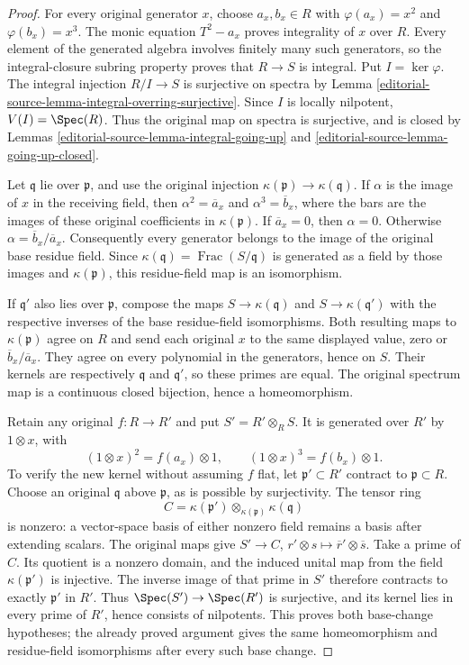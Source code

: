 \begin{proof}
For every original generator $x$, choose $a_x,b_x\in R$
with $\varphi(a_x)=x^2$ and $\varphi(b_x)=x^3$.
The monic equation $T^2-a_x$ proves integrality of
$x$ over $R$. Every element of the generated algebra
involves finitely many such generators, so the
integral-closure subring property proves that
$R\to S$ is integral. Put $I=\ker\varphi$.
The integral injection $R/I\to S$ is surjective
on spectra by Lemma \ref{editorial-source-lemma-integral-overring-surjective}.
Since $I$ is locally nilpotent, $V(I)=\Spec(R)$.
Thus the original map on spectra is surjective,
and is closed by Lemmas \ref{editorial-source-lemma-integral-going-up}
and \ref{editorial-source-lemma-going-up-closed}.

Let $\mathfrak q$ lie over $\mathfrak p$, and use
the original injection
$\kappa(\mathfrak p)\to\kappa(\mathfrak q)$.
If $\alpha$ is the image of $x$ in the receiving
field, then $\alpha^2=\overline a_x$ and
$\alpha^3=\overline b_x$, where the bars are the
images of these original coefficients in
$\kappa(\mathfrak p)$. If $\overline a_x=0$,
then $\alpha=0$. Otherwise
$\alpha=\overline b_x/\overline a_x$.
Consequently every generator belongs to the
image of the original base residue field.
Since $\kappa(\mathfrak q)=\operatorname{Frac}(S/\mathfrak q)$
is generated as a field by those images and
$\kappa(\mathfrak p)$, this residue-field map
is an isomorphism.

If $\mathfrak q'$ also lies over $\mathfrak p$,
compose the maps $S\to\kappa(\mathfrak q)$ and
$S\to\kappa(\mathfrak q')$ with the respective
inverses of the base residue-field isomorphisms.
Both resulting maps to $\kappa(\mathfrak p)$
agree on $R$ and send each original $x$ to
the same displayed value, zero or
$\overline b_x/\overline a_x$.
They agree on every polynomial in the
generators, hence on $S$. Their kernels
are respectively $\mathfrak q$ and
$\mathfrak q'$, so these primes are equal.
The original spectrum map is a continuous
closed bijection, hence a homeomorphism.

Retain any original $f:R\to R'$ and put
$S'=R'\otimes_R S$. It is generated over
$R'$ by $1\otimes x$, with
$$
(1\otimes x)^2=f(a_x)\otimes1,
\qquad (1\otimes x)^3=f(b_x)\otimes1.
$$
To verify the new kernel without assuming
$f$ flat, let $\mathfrak p'\subset R'$
contract to $\mathfrak p\subset R$.
Choose an original $\mathfrak q$ above
$\mathfrak p$, as is possible by surjectivity.
The tensor ring
$$
C=\kappa(\mathfrak p')\otimes_{\kappa(\mathfrak p)}
\kappa(\mathfrak q)
$$
is nonzero: a vector-space basis of either
nonzero field remains a basis after extending
scalars. The original maps give
$S'\to C$, $r'\otimes s\mapsto\overline r'\otimes\overline s$.
Take a prime of $C$. Its quotient is a
nonzero domain, and the induced unital
map from the field $\kappa(\mathfrak p')$
is injective. The inverse image of that
prime in $S'$ therefore contracts to
exactly $\mathfrak p'$ in $R'$.
Thus $\Spec(S')\to\Spec(R')$ is surjective,
and its kernel lies in every prime of
$R'$, hence consists of nilpotents.
This proves both base-change hypotheses;
the already proved argument gives the
same homeomorphism and residue-field
isomorphisms after every such base change.


\end{proof}
